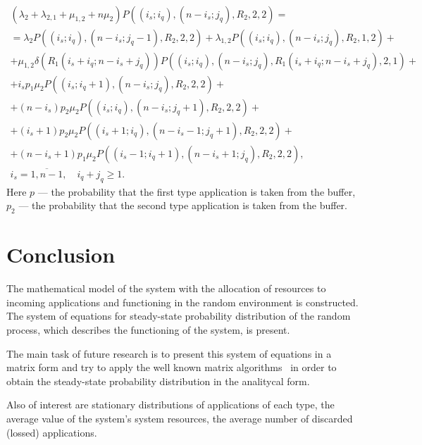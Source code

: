 \documentclass[default]{subfiles}
\begin{document}
{\begin{multline}
\label{eq:10.3}
\end{multline}
\begin{multline}
  \left(\lambda_2 +\lambda_{2,1}+\mu_{1,2}+n\mu_2\right)
  P\left((i_s;i_q),(n-i_s;j_q),R_2,2,2\right) = \\ =
  \lambda_2 P\left((i_s;i_q),(n-i_s;j_q-1),R_2,2,2\right) +
  \lambda_{1,2} P\left((i_s;i_q),(n-i_s;j_q),R_2,1,2\right) + \\ +
  \mu_{1,2}  \delta\left(R_1(i_s+i_q; n-i_s+j_q)\right)
  P\left((i_s;i_q),(n-i_s;j_q),R_1(i_s+i_q; n-i_s+j_q),2,1\right) + \\ +
  i_s p_1\mu_2  P\left((i_s;i_q+1),(n-i_s;j_q),R_2,2,2\right) + \\ +
  (n-i_s) p_2 \mu_2  P\left((i_s;i_q),(n-i_s;j_q+1),R_2,2,2\right) +
  \\ +
  (i_s+1) p_2 \mu_2  P\left((i_s+1;i_q),(n-i_s-1;j_q+1),R_2,2,2\right)
  + \\ +
  (n-i_s+1) p_1\mu_2 P\left((i_s-1;i_q+1),(n-i_s+1;j_q),R_2,2,2\right), \\
  i_s=\overline{1,n-1},\quad  i_q+j_q\geqslant  1.
\label{eq:10.4}
\end{multline}
Here $p$ --- the probability that the first type application is taken
from the buffer, $p_2$ --- the probability that the second type
application is taken from the buffer.


\section{Conclusion}

The mathematical model of the system with the allocation of resources
to incoming applications and functioning in the random environment is
constructed. The system of equations for steady-state probability
distribution of the random process, which describes the functioning of
the system, is present.

The main task of future research is to present this system of
equations in a matrix form and try to apply the well known matrix
algorithms~\cite{Neuts4,Neuts5,MMAP-book1,MMAP-book2,MMAP-book4} in
order to obtain the steady-state probability distribution in the
analitycal form.

Also of interest are stationary distributions of applications of each
type, the average value of the system's system resources, the average
number of discarded (lossed) applications.


}
\end{document}

